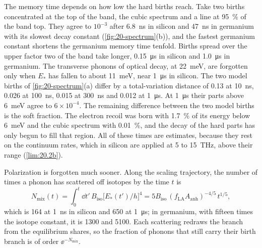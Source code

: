 The memory time depends on how low the hard births reach. Take two births concentrated at the top of the band, the cubic spectrum and a line at \SI{95}{\percent} of the band top. They agree to $10^{-3}$ after \SI{6.8}{ns} in silicon and \SI{47}{ns} in germanium with its slowest decay constant (\cref{fig:20-spectrum}(b)), and the fastest germanium constant shortens the germanium memory time tenfold. Births spread over the upper factor two of the band take longer, \SI{0.15}{\micro s} in silicon and \SI{1.0}{\micro s} in germanium. The transverse phonons of optical decay, at \SI{22}{meV}, are forgotten only when $E_*$ has fallen to about \SI{11}{meV}, near \SI{1}{\micro s} in silicon. The two model births of \cref{fig:20-spectrum}(a) differ by a total-variation distance of 0.13 at \SI{10}{ns}, 0.026 at \SI{100}{ns}, 0.015 at \SI{300}{ns} and 0.012 at \SI{1}{\micro s}. At \SI{1}{\micro s} their parts above \SI{6}{meV} agree to $6\times10^{-4}$. The remaining difference between the two model births is the soft fraction. The electron recoil was born with \SI{1.7}{\percent} of its energy below \SI{6}{meV} and the cubic spectrum with \SI{0.01}{\percent}, and the decay of the hard parts has only begun to fill that region. All of these times are estimates, because they rest on the continuum rates, which in silicon are applied at 5 to \SI{15}{THz}, above their range (\cref{lim:20.2b}).

Polarization is forgotten much sooner. Along the scaling trajectory, the number of times a phonon has scattered off isotopes by the time $t$ is
\begin{equation}
  N_{\mathrm{mix}}(t) = \int_0^t\dd t'\,B_{\mathrm{iso}}\bigl[E_*(t')/h\bigr]^4 = 5B_{\mathrm{iso}}\,(f_{\mathrm{LA}}A_{\mathrm{anh}})^{-4/5}\,t^{1/5} ,
  \label{eq:20.2-Nmix}
\end{equation}
which is 164 at \SI{1}{ns} in silicon and 650 at \SI{1}{\micro s}; in germanium, with fifteen times the isotope constant, it is \num{1300} and \num{5100}. Each scattering redraws the branch from the equilibrium shares, so the fraction of phonons that still carry their birth branch is of order $\ee^{-N_{\mathrm{mix}}}$.

